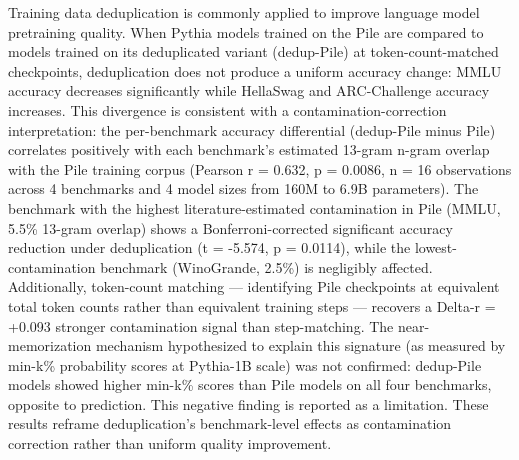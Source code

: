 
Training data deduplication is commonly applied to improve language model pretraining quality. When Pythia models trained on the Pile are compared to models trained on its deduplicated variant (dedup-Pile) at token-count-matched checkpoints, deduplication does not produce a uniform accuracy change: MMLU accuracy decreases significantly while HellaSwag and ARC-Challenge accuracy increases. This divergence is consistent with a contamination-correction interpretation: the per-benchmark accuracy differential (dedup-Pile minus Pile) correlates positively with each benchmark's estimated 13-gram n-gram overlap with the Pile training corpus (Pearson r = 0.632, p = 0.0086, n = 16 observations across 4 benchmarks and 4 model sizes from 160M to 6.9B parameters). The benchmark with the highest literature-estimated contamination in Pile (MMLU, 5.5\% 13-gram overlap) shows a Bonferroni-corrected significant accuracy reduction under deduplication (t = -5.574, p = 0.0114), while the lowest-contamination benchmark (WinoGrande, 2.5\%) is negligibly affected. Additionally, token-count matching --- identifying Pile checkpoints at equivalent total token counts rather than equivalent training steps --- recovers a Delta-r = +0.093 stronger contamination signal than step-matching. The near-memorization mechanism hypothesized to explain this signature (as measured by min-k\% probability scores at Pythia-1B scale) was not confirmed: dedup-Pile models showed higher min-k\% scores than Pile models on all four benchmarks, opposite to prediction. This negative finding is reported as a limitation. These results reframe deduplication's benchmark-level effects as contamination correction rather than uniform quality improvement.

